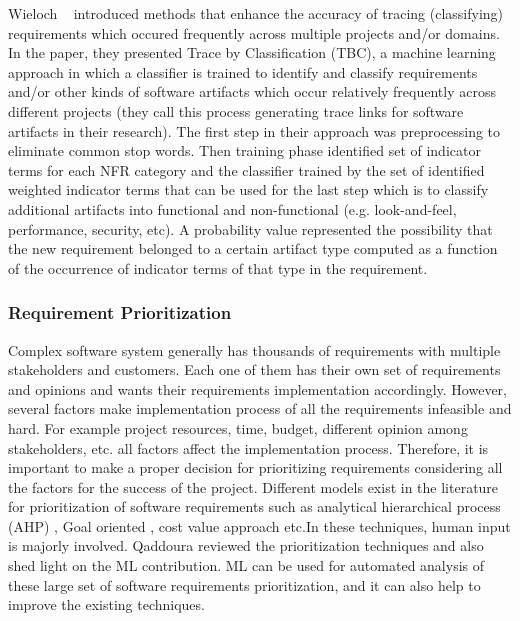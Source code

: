 	Wieloch \etal~\cite{Wieloch:2013} introduced methods that enhance the accuracy
of tracing (classifying) requirements which occured frequently across multiple
projects and/or domains. In the paper, they presented Trace by  Classification
(TBC),  a machine learning approach in which a classifier is trained to identify
and classify requirements and/or other kinds of software artifacts which occur
relatively frequently across different projects (they call this process
generating trace links for software artifacts in their research). The first step
in their approach was preprocessing to eliminate common stop words.
Then training phase identified set of indicator terms for each NFR category and the classifier trained by the set of identified
weighted indicator terms that can be used for the last step which is to
classify additional artifacts into functional and non-functional (e.g.
look-and-feel, performance, security, etc). A probability value represented the
possibility that the new requirement belonged to a certain artifact type
computed as a function of the occurrence of indicator terms of that type in the
requirement.\\

\subsubsection{Requirement Prioritization}
Complex software system generally has thousands of requirements with multiple
stakeholders and customers. Each one of them has their own set of requirements
and opinions and wants their requirements implementation accordingly. However,
several factors make implementation process of all the requirements infeasible
and hard. For example project resources, time, budget, different opinion among
stakeholders, etc. all factors affect the implementation process. Therefore, it
is important to make a proper decision for prioritizing requirements considering
all the factors for the success of the project. Different models exist in the
literature for prioritization of software requirements such as analytical
hierarchical process (AHP) \cite{saaty2008}, Goal oriented
\cite{VanLamsweerde:2001}, cost value approach \cite{Karlsson:1997} etc.In these
techniques, human input is majorly involved. Qaddoura \etal \cite{RQaddoura}
reviewed the prioritization techniques and also shed light on the ML
contribution. ML can be used for automated analysis of these large set of
software requirements prioritization, and it can also help to improve the existing techniques.\\

